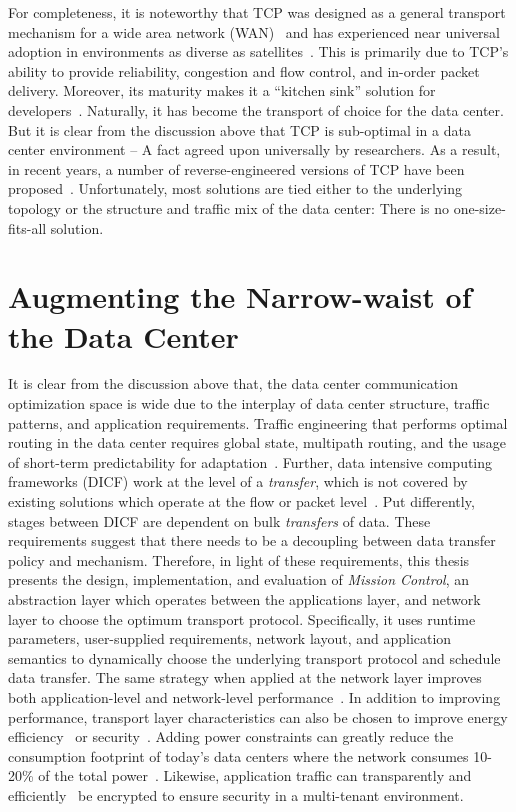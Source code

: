 \documentclass[a4paper,12pt,twoside,openright]{report}
\begin{document}
For completeness, it is noteworthy that TCP was designed as a general transport
mechanism for a wide area network (WAN)~\cite{Clark:1988:DPD} and has
experienced near universal adoption in environments as diverse as
satellites~\cite{Henderson:1999:TPF}.
This is primarily due to TCP's ability to provide reliability, congestion and
flow control, and in-order packet delivery.
Moreover, its maturity makes it a ``kitchen sink'' solution for
developers~\cite{Vasudevan:2009:SEF}. Naturally, it has become the transport of
choice for the data center. But it is clear from the discussion above that TCP
is sub-optimal in a data center environment -- A fact agreed upon universally by
researchers. As a result, in recent years, a number of reverse-engineered
versions of TCP have been
proposed~\cite{Alizadeh:2010:DCT,Wu:2010:IIC,Wilson:2011:BNL,Vasudevan:2009:SEF,Chen:2009:UTI}.
Unfortunately, most solutions are tied either to the underlying topology or the
structure and traffic mix of the data center: There is no one-size-fits-all
solution.

\section{Augmenting the Narrow-waist of the Data Center}
It is clear from the discussion above that, the data center communication
optimization space is wide due to the interplay of data center structure,
traffic patterns, and application requirements. Traffic engineering that
performs optimal routing in the data center requires global state, multipath
routing, and the usage of short-term predictability for
adaptation~\cite{Benson:2010:CFT}. Further, data intensive computing frameworks
(DICF) work at the level of a \emph{transfer}, which is not covered by existing
solutions which operate at the flow or packet level~\cite{Chowdhury:2011:MDT}.
Put differently, stages between DICF are dependent on bulk \emph{transfers} of
data. These requirements suggest that there needs to be a decoupling between
data transfer policy and mechanism. Therefore, in light of these requirements,
this thesis presents the design, implementation, and evaluation of \emph{Mission
Control}, an abstraction layer which operates between the applications layer,
and network layer to choose the optimum transport protocol. Specifically, it
uses runtime parameters, user-supplied requirements, network layout, and
application semantics to dynamically choose the underlying transport protocol
and schedule data transfer. The same strategy when applied at the network layer
improves both application-level and network-level
performance~\cite{Abu-Libdeh:2010:SRF}. In addition to improving performance,
transport layer characteristics can also be chosen to improve energy
efficiency~\cite{Heller:2010:ESE} or security~\cite{bittau:the}. Adding power
constraints can greatly reduce the consumption footprint of today's data centers
where the network consumes 10-20\% of the total power~\cite{Greenberg:2008:CCR}.
Likewise, application traffic can transparently and
efficiently~\cite{bittau:the} be encrypted to ensure security in a multi-tenant
environment.
\end{document}
